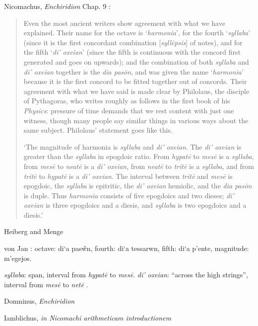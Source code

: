 \documentclass{article}
\newcommand{\textgreek}[1]{\begingroup\fontencoding{LGR}\selectfont#1\endgroup}
\theoremstyle{definition}
\begin{document}
Nicomachus, {\em Enchiridion} Chap. 9 \cite[p.~261]{barker}:

\begin{quote}
Even the most ancient writers show agreement with what we have explained.
Their name for the octave is `{\em harmonia}', for the fourth `{\em syllaba}' (since it is the
first concordant combination [{\em syll\={e}psis}] of notes), and for the fifth `{\em di' oxeian}'
(since the fifth is continuous with the concord first generated and goes on
upwards); and the combination of both {\em syllaba} and {\em di' oxeian} together is the
{\em dia pas\={o}n}, and was given the name `{\em harmonia}' because it is the first concord
to be fitted together out of concords. Their agreement with what we have said
is made clear by Philolaus, the disciple of Pythagoras, who writes roughly as
follows in the first book of his {\em Physics}: pressure of time demands that we rest
content with just one witness, though many people say similar things in various
ways about the same subject. Philolaus' statement goes like this.

`The magnitude of harmonia is {\em syllaba} and {\em di' oxeian}. The {\em di' oxeian} is
greater than the {\em syllaba} in epogdoic ratio. From {\em hypat\={e}} to {\em mes\={e}}
is a {\em syllaba},
from {\em mes\={e}} to {\em neat\={e}} is a {\em di' oxeian}, from {\em neat\={e}} to
{\em trit\={e}} is a {\em syllaba}, and from {\em trit\={e}}
to {\em hypat\={e}} is a {\em di' oxeian}. The interval between {\em trit\={e}}
and {\em mes\={e}} is epogdoic, the
{\em syllaba} is epitritic, the {\em di' oxeian} hemiolic, and the {\em dia pas\={o}n} is duple. Thus
{\em harmonia} consists of five epogdoics and two dieses; {\em di' oxeian} is three
epogdoics and a diesis, and {\em syllaba} is two epogdoics and a diesis.'
\end{quote}

Heiberg and Menge \cite{euclidVIII}

von Jan \cite[p.~252]{MSG}: octave: \textgreek{di`a pas\~wn}, 
fourth: \textgreek{di`a tessarwn},
fifth: \textgreek{di`a p'ente},
magnitude: \textgreek{m'egejos}.

{\em syllaba}: span, interval from {\em hypat\={e}} to {\em mes\={e}}.
{\em di' oxeian}: ``across the high strings'', interval from {\em mes\={e}} to {\em net\={e}} \cite[p.~219]{west}.

Domninus, {\em Enchiridion} \cite{domninus}

Iamblichus, {\em in Nicomachi arithmeticam introductionem} \cite{iamblichus}
\end{document}
